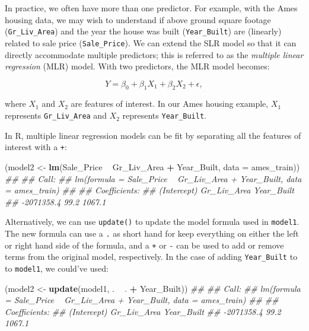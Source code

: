 \documentclass[]{krantz}
\makeatletter
\newenvironment{Shaded}{\begin{snugshade}}{\end{snugshade}}
\newcommand{\CommentTok}[1]{\textcolor[rgb]{0.37,0.37,0.37}{\textit{#1}}}
\newcommand{\DataTypeTok}[1]{\textcolor[rgb]{0.27,0.27,0.27}{#1}}
\newcommand{\KeywordTok}[1]{\textcolor[rgb]{0.27,0.27,0.27}{\textbf{#1}}}
\newcommand{\NormalTok}[1]{#1}
\newcommand{\OperatorTok}[1]{\textcolor[rgb]{0.43,0.43,0.43}{\textbf{#1}}}
\newcommand{\StringTok}[1]{\textcolor[rgb]{0.5,0.5,0.5}{#1}}
\newenvironment{kframe}{%
\medskip{}
\setlength{\fboxsep}{.8em}
 \def\at@end@of@kframe{}%
 \ifinner\ifhmode%
  \def\at@end@of@kframe{\end{minipage}}%
  \begin{minipage}{\columnwidth}%
 \fi\fi%
 \def\FrameCommand##1{\hskip\@totalleftmargin \hskip-\fboxsep
 \colorbox{shadecolor}{##1}\hskip-\fboxsep
     \hskip-\linewidth \hskip-\@totalleftmargin \hskip\columnwidth}%
 \MakeFramed {\advance\hsize-\width
   \@totalleftmargin\z@ \linewidth\hsize
   \@setminipage}}%
 {\par\unskip\endMakeFramed%
 \at@end@of@kframe}
\renewenvironment{Shaded}{\begin{kframe}}{\end{kframe}}
\makeatother
\begin{document}
In practice, we often have more than one predictor. For example, with the Ames housing data, we may wish to understand if above ground square footage (\texttt{Gr\_Liv\_Area}) and the year the house was built (\texttt{Year\_Built}) are (linearly) related to sale price (\texttt{Sale\_Price}). We can extend the SLR model so that it can directly accommodate multiple predictors; this is referred to as the \emph{multiple linear regression} (MLR) model. With two predictors, the MLR model becomes:

\begin{equation}
  Y = \beta_0 + \beta_1 X_1 + \beta_2 X_2 + \epsilon,
\end{equation}

where \(X_1\) and \(X_2\) are features of interest. In our Ames housing example, \(X_1\) represents \texttt{Gr\_Liv\_Area} and \(X_2\) represents \texttt{Year\_Built}.

In R, multiple linear regression models can be fit by separating all the features of interest with a \texttt{+}:

\begin{Shaded}
\begin{Highlighting}[]
\NormalTok{(model2 <-}\StringTok{ }\KeywordTok{lm}\NormalTok{(Sale_Price }\OperatorTok{~}\StringTok{ }\NormalTok{Gr_Liv_Area }\OperatorTok{+}\StringTok{ }\NormalTok{Year_Built, }\DataTypeTok{data =}\NormalTok{ ames_train))}
\CommentTok{## }
\CommentTok{## Call:}
\CommentTok{## lm(formula = Sale_Price ~ Gr_Liv_Area + Year_Built, data = ames_train)}
\CommentTok{## }
\CommentTok{## Coefficients:}
\CommentTok{## (Intercept)  Gr_Liv_Area   Year_Built  }
\CommentTok{##  -2071358.4         99.2       1067.1}
\end{Highlighting}
\end{Shaded}

Alternatively, we can use \texttt{update()} to update the model formula used in \texttt{model1}. The new formula can use a \texttt{.} as short hand for keep everything on either the left or right hand side of the formula, and a \texttt{+} or \texttt{-} can be used to add or remove terms from the original model, respectively. In the case of adding \texttt{Year\_Built} to to \texttt{model1}, we could've used:

\begin{Shaded}
\begin{Highlighting}[]
\NormalTok{(model2 <-}\StringTok{ }\KeywordTok{update}\NormalTok{(model1, . }\OperatorTok{~}\StringTok{ }\NormalTok{. }\OperatorTok{+}\StringTok{ }\NormalTok{Year_Built))}
\CommentTok{## }
\CommentTok{## Call:}
\CommentTok{## lm(formula = Sale_Price ~ Gr_Liv_Area + Year_Built, data = ames_train)}
\CommentTok{## }
\CommentTok{## Coefficients:}
\CommentTok{## (Intercept)  Gr_Liv_Area   Year_Built  }
\CommentTok{##  -2071358.4         99.2       1067.1}
\end{Highlighting}
\end{Shaded}
\end{document}
